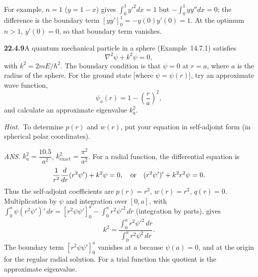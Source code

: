 For example, $n=1$ ($y=1-x$) gives $\int_0^1y'^2dx=1$ but
$-\int_0^1yy''dx=0$; the difference is the boundary term
$[yy']_0^1=-y(0)y'(0)=1$. At the optimum $n>1$, $y'(0)=0$, so that
boundary term vanishes.


\par\bigskip
\noindent\textbf{22.4.9}\quad A quantum mechanical particle in a
sphere (Example~14.7.1) satisfies
\[
\nabla^{2}\psi+k^{2}\psi=0,
\]
with $k^{2}=2mE/\hbar^{2}$. The boundary condition is that
$\psi=0$ at $r=a$, where $a$ is the radius of the sphere. For
the ground state [where $\psi=\psi(r)$], try an approximate wave
function,
\[
\psi_{a}(r)=1-\left(\frac{r}{a}\right)^{2},
\]
and calculate an approximate eigenvalue $k_{a}^{2}$.
\par\emph{Hint.}~To determine $p(r)$ and $w(r)$, put your
equation in self-adjoint form (in spherical polar coordinates).
\par\nobreak\hfill\emph{ANS.}\enspace
$k_{a}^{2}=\dfrac{10.5}{a^{2}}$,\quad
$k_{\text{exact}}^{2}=\dfrac{\pi^{2}}{a^{2}}$.
\solution
For a radial function, the differential equation is
\[
 \frac1{r^2}\frac d{dr}(r^2\psi')+k^2\psi=0,
 \quad\hbox{or}\quad
 (r^2\psi')'+k^2r^2\psi=0.
\]
Thus the self-adjoint coefficients are
$p(r)=r^2$, $w(r)=r^2$, $q(r)=0$.  Multiplication by $\psi$ and
integration over $[0,a]$, with
$\int_0^a\psi(r^2\psi')'\,dr=[r^2\psi\psi']_0^a-\int_0^ar^2\psi'^2\,dr$
(integration by parts), gives
\[
 k^2=\frac{\int_0^ar^2\psi'^2\,dr}
           {\int_0^ar^2\psi^2\,dr}.
\]
The boundary term $[r^2\psi\psi']_0^a$ vanishes at $a$ because
$\psi(a)=0$, and at the origin for the regular radial solution.
For a trial function this quotient is the approximate eigenvalue.

